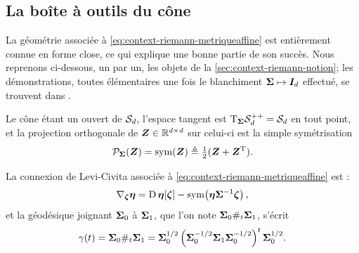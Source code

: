 \subsection{La boîte à outils du cône}

La géométrie associée à \cref{eq:context-riemann-metriqueaffine} est entièrement connue en forme close, ce qui explique une bonne partie de son succès. Nous reprenons ci-dessous, un par un, les objets de la \cref{sec:context-riemann-notion}; les démonstrations, toutes élémentaires une fois le blanchiment $\boldsymbol{\Sigma}\mapsto\boldsymbol{I}_{d}$ effectué, se trouvent dans .

\begin{property}
\label{prop:context-riemann-projspd}
  Le cône étant un ouvert de $\mathcal{S}_{d}$, l'espace tangent est $\mathrm{T}_{\boldsymbol{\Sigma}}\mathcal{S}_{d}^{++}=\mathcal{S}_{d}$ en tout point, et la projection orthogonale de $\boldsymbol{Z}\in\mathbb{R}^{d\times d}$ sur celui-ci est la simple symétrisation
  \begin{equation}
    \mathcal{P}_{\boldsymbol{\Sigma}}(\boldsymbol{Z})=\operatorname{\operatorname{sym}}(\boldsymbol{Z})\triangleq\tfrac{1}{2}(\boldsymbol{Z}+\boldsymbol{Z}^{\mathrm{T}}).
    \label{eq:context-riemann-projspd}
  \end{equation}
\end{property}

\begin{property}
\label{prop:context-riemann-geodspd}
  La connexion de Levi-Civita associée à \cref{eq:context-riemann-metriqueaffine} est :
  \begin{equation}
    \nabla_{\boldsymbol{\zeta}}\boldsymbol{\eta} = \operatorname{\mathrm{D}}\boldsymbol{\eta}[\boldsymbol{\zeta}] - \operatorname{\operatorname{sym}}\!\left(\boldsymbol{\eta}{\boldsymbol{\Sigma}}^{-1}\boldsymbol{\zeta}\right),
    \label{eq:context-riemann-connexionspd}
  \end{equation}
  et la géodésique joignant $\boldsymbol{\Sigma}_0$ à $\boldsymbol{\Sigma}_1$, que l'on note $\boldsymbol{\Sigma}_0\#_t\boldsymbol{\Sigma}_1$, s'écrit
  \begin{equation}
    \gamma(t)
    =
    \boldsymbol{\Sigma}_0\#_t\boldsymbol{\Sigma}_1
    =
    \boldsymbol{\Sigma}_0^{1/2}
    \left(
      \boldsymbol{\Sigma}_0^{-1/2}\boldsymbol{\Sigma}_1\boldsymbol{\Sigma}_0^{-1/2}
    \right)^{t}
    \boldsymbol{\Sigma}_0^{1/2}.
    \label{eq:context-riemann-geodspd}
  \end{equation}
\end{property}

